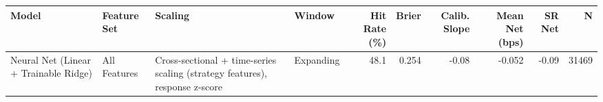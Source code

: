 \begin{tabular}{llllrrrrrr}
\toprule
Model & Feature Set & Scaling & Window & Hit Rate (\%) & Brier & Calib. Slope & Mean Net (bps) & SR Net & N \\
\midrule
Neural Net (Linear + Trainable Ridge) & All Features & Cross-sectional + time-series scaling (strategy features), response z-score & Expanding & 48.1 & 0.254 & -0.08 & -0.052 & -0.09 & 31469 \\
\bottomrule
\end{tabular}
